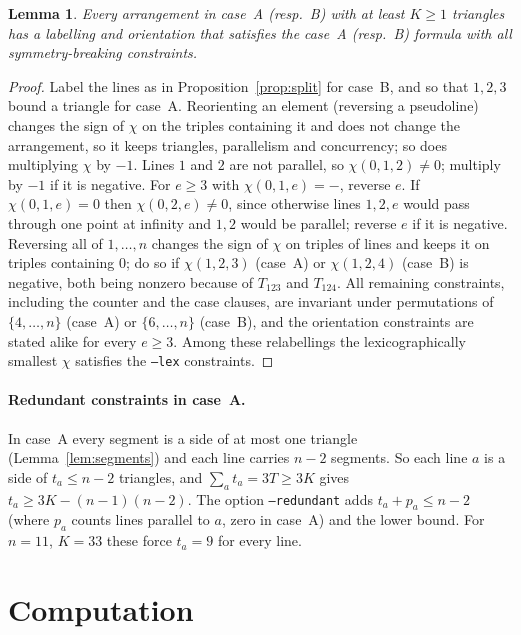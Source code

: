 \documentclass[11pt]{article}
\newtheorem{lemma}{Lemma}
\theoremstyle{definition}
\theoremstyle{remark}
\begin{document}
\begin{lemma}\label{lem:sym}
Every arrangement in case~A (resp.\ B) with at least $K \ge 1$ triangles has a labelling and
orientation that satisfies the case~A (resp.\ B) formula with all symmetry-breaking constraints.
\end{lemma}
\begin{proof}
Label the lines as in Proposition~\ref{prop:split} for case~B, and so that $1, 2, 3$ bound a
triangle for case~A. Reorienting an element (reversing a pseudoline) changes the sign of $\chi$ on
the triples containing it and does not change the arrangement, so it keeps triangles, parallelism
and concurrency; so does multiplying $\chi$ by $-1$. Lines $1$ and $2$ are not parallel, so
$\chi(0,1,2) \ne 0$; multiply by $-1$ if it is negative. For $e \ge 3$ with $\chi(0,1,e) = -$,
reverse $e$. If $\chi(0,1,e) = 0$ then $\chi(0,2,e) \ne 0$, since otherwise lines $1, 2, e$ would
pass through one point at infinity and $1, 2$ would be parallel; reverse $e$ if it is negative.
Reversing all of $1, \dots, n$ changes the sign of $\chi$ on triples of lines and keeps it on
triples containing $0$; do so if $\chi(1,2,3)$ (case~A) or $\chi(1,2,4)$ (case~B) is negative,
both being nonzero because of $T_{123}$ and $T_{124}$. All remaining constraints, including the
counter and the case clauses, are invariant under permutations of $\{4, \dots, n\}$ (case~A) or
$\{6, \dots, n\}$ (case~B), and the orientation constraints are stated alike for every $e \ge 3$.
Among these relabellings the lexicographically smallest $\chi$ satisfies the \texttt{--lex}
constraints.
\end{proof}

\paragraph{Redundant constraints in case~A.} In case~A every segment is a side of at most one
triangle (Lemma~\ref{lem:segments}) and each line carries $n-2$ segments. So each line $a$ is a side
of $t_a \le n - 2$ triangles, and $\sum_a t_a = 3T \ge 3K$ gives
$t_a \ge 3K - (n-1)(n-2)$. The option \texttt{--redundant} adds $t_a + p_a \le n - 2$ (where $p_a$
counts lines parallel to $a$, zero in case~A) and the lower bound. For $n = 11$, $K = 33$ these
force $t_a = 9$ for every line.

\section{Computation}\label{sec:computation}
\end{document}

